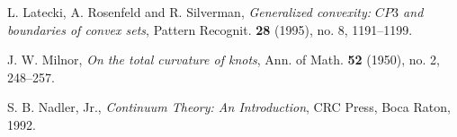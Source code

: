 \documentclass{amsart}
\newtheorem{conjecture}[proposition]{Conjecture}
\theoremstyle{definition}
\theoremstyle{remark}
\begin{document}



\begin{thebibliography}{9}

    L. Latecki, A. Rosenfeld and R. Silverman,
    \emph{Generalized convexity: $CP3$ and boundaries of convex sets},
    Pattern Recognit.
    \textbf{28} (1995), no. 8, 1191--1199.

    J. W. Milnor,
    \emph{On the total curvature of knots},
    Ann. of Math.
    \textbf{52} (1950), no. 2, 248--257.

    S. B. Nadler, Jr.,
    \emph{Continuum Theory: An Introduction},
    CRC Press, Boca Raton, 1992.

\end{thebibliography}
\end{document}
